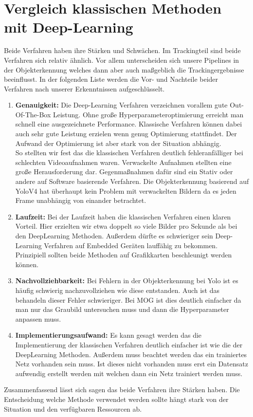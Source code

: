 \documentclass[conference]{IEEEtran}
\begin{document}
	\section{Vergleich klassischen Methoden mit Deep-Learning}
	Beide Verfahren haben ihre Stärken und Schwächen. Im Trackingteil sind beide Verfahren sich relativ ähnlich. Vor allem unterscheiden sich unsere Pipelines in der Objekterkennung welches dann aber auch maßgeblich die Trackingergebnisse beeinflusst. In der folgenden Liste werden die Vor- und Nachteile beider Verfahren nach unserer Erkenntnissen aufgeschlüsselt.
	\begin{enumerate}
		\item \textbf{Genauigkeit:} Die Deep-Learning Verfahren verzeichnen vorallem gute Out-Of-The-Box Leistung. Ohne große Hyperparameteroptimierung erreicht man schnell eine ausgezeichnete Performance. Klassische Verfahren können dabei auch sehr gute Leistung erzielen wenn genug Optimierung stattfindet. Der Aufwand der Optimierung ist aber stark von der Situation abhängig.\\
		So stellten wir fest das die klassischen Verfahren deutlich fehleranfälliger bei schlechten Videoaufnahmen waren. Verwackelte Aufnahmen stellten eine große Herausforderung dar. Gegenmaßnahmen dafür sind ein Stativ oder andere auf Software basierende Verfahren. Die Objekterkennung basierend auf YoloV4 hat überhaupt kein Problem mit verwackelten Bildern da es jeden Frame unabhängig von einander betrachtet.
		
		\item \textbf{Laufzeit:} Bei der Laufzeit haben die klassischen Verfahren einen klaren Vorteil. Hier erzielten wir etwa doppelt so viele Bilder pro Sekunde als bei den DeepLearning Methoden. Außerdem dürfte es schwieriger sein Deep-Learning Verfahren auf Embedded Geräten lauffähig zu bekommen. Prinzipiell sollten beide Methoden auf Grafikkarten beschleunigt werden können.
		
		\item \textbf{Nachvollziehbarkeit:} Bei Fehlern in der Objekterkennung bei Yolo ist es häufig schwierig nachzuvollziehen wie diese entstanden. Auch ist das behandeln dieser Fehler schwieriger. Bei MOG ist dies deutlich einfacher da man nur das Graubild untersuchen muss und dann die Hyperparameter anpassen muss.
		
		\item \textbf{Implementierungsaufwand:} Es kann gesagt werden das die Implementierung der klassischen Verfahren deutlich einfacher ist wie die der DeepLearning Methoden. Außerdem muss beachtet werden das ein trainiertes Netz vorhanden sein muss. Ist dieses nicht vorhanden muss erst ein Datensatz aufwendig erstellt werden mit welchen dann ein Netz trainiert werden muss.
		
	\end{enumerate}
	Zusammenfassend lässt sich sagen das beide Verfahren ihre Stärken haben. Die Entscheidung welche Methode verwendet werden sollte hängt stark von der Situation und den verfügbaren Ressourcen ab.
	
\end{document}
